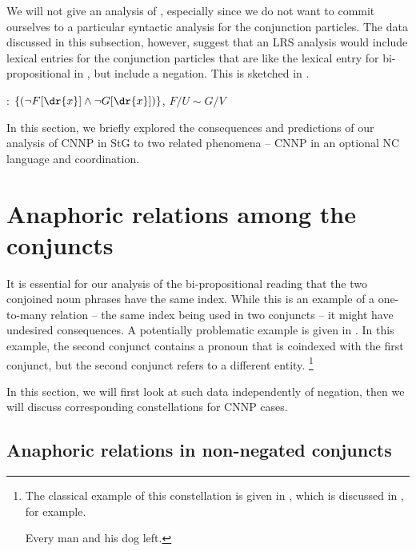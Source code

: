 \documentclass[output=paper]{langsci/langscibook}
\begin{document}
We will not give an analysis of , especially since we do not want to commit ourselves to a particular syntactic analysis for the conjunction particles. The data discussed in this subsection, however, suggest that an LRS analysis would include lexical entries for the conjunction particles that are like the lexical entry for bi-propositional  in , but include a negation. This is sketched in .

\ea \label{le-weder}
: $\{(\lnot F[\dr{x}] \land \lnot G[\dr{x}])\}$, $F/U \sim G/V$
\z 


In this section, we briefly explored the consequences and predictions of our analysis of CNNP in StG to two related phenomena -- CNNP in an optional NC language and  coordination. 

\section{Anaphoric relations among the conjuncts}\label{Sec-Anaphor}\largerpage[2]

It is essential for our analysis of the bi-propositional reading that the two conjoined noun phrases have the same index. 
While this is an example of a one-to-many relation -- the same index being used in two conjuncts -- it might have undesired consequences.
A potentially problematic example is given in . 
In this example, the second conjunct contains a pronoun that is coindexed with the first conjunct, but the second conjunct refers to a different entity.%
\footnote{The classical example of this constellation is given in , which is discussed in \citet[24]{Moltmann:92}, for example.

\ea Every man and his dog left.\label{dog} \z}

\ea \label{ex-some-actress}
\judgewidth{$=$}
\begin{xlist}
\end{xlist}
\z

In this section, we will first look at such data independently of negation, then we will discuss corresponding constellations for CNNP cases.


\subsection{Anaphoric relations in non-negated conjuncts}
\label{Sec-Anaphor-Pos}
\end{document}
